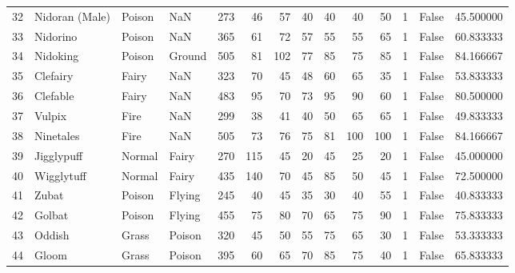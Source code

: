 \begin{tabular}{rlllrrrrrrrrlr}
  32 &             Nidoran (Male) &    Poison &       NaN &    273 &   46 &      57 &       40 &       40 &       40 &     50 &           1 &      False &   45.500000 \\
  33 &                   Nidorino &    Poison &       NaN &    365 &   61 &      72 &       57 &       55 &       55 &     65 &           1 &      False &   60.833333 \\
  34 &                   Nidoking &    Poison &    Ground &    505 &   81 &     102 &       77 &       85 &       75 &     85 &           1 &      False &   84.166667 \\
  35 &                   Clefairy &     Fairy &       NaN &    323 &   70 &      45 &       48 &       60 &       65 &     35 &           1 &      False &   53.833333 \\
  36 &                   Clefable &     Fairy &       NaN &    483 &   95 &      70 &       73 &       95 &       90 &     60 &           1 &      False &   80.500000 \\
  37 &                     Vulpix &      Fire &       NaN &    299 &   38 &      41 &       40 &       50 &       65 &     65 &           1 &      False &   49.833333 \\
  38 &                  Ninetales &      Fire &       NaN &    505 &   73 &      76 &       75 &       81 &      100 &    100 &           1 &      False &   84.166667 \\
  39 &                 Jigglypuff &    Normal &     Fairy &    270 &  115 &      45 &       20 &       45 &       25 &     20 &           1 &      False &   45.000000 \\
  40 &                 Wigglytuff &    Normal &     Fairy &    435 &  140 &      70 &       45 &       85 &       50 &     45 &           1 &      False &   72.500000 \\
  41 &                      Zubat &    Poison &    Flying &    245 &   40 &      45 &       35 &       30 &       40 &     55 &           1 &      False &   40.833333 \\
  42 &                     Golbat &    Poison &    Flying &    455 &   75 &      80 &       70 &       65 &       75 &     90 &           1 &      False &   75.833333 \\
  43 &                     Oddish &     Grass &    Poison &    320 &   45 &      50 &       55 &       75 &       65 &     30 &           1 &      False &   53.333333 \\
  44 &                      Gloom &     Grass &    Poison &    395 &   60 &      65 &       70 &       85 &       75 &     40 &           1 &      False &   65.833333 \\

\end{tabular}
